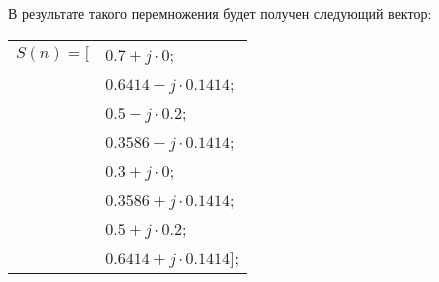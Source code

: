 В результате такого перемножения будет получен следующий вектор:
\begin{table}[H]
    \centering
    \begin{tabular}{ll}
        \(S(n) = [\) & 
        \(0.7 + j \cdot 0\); \\
        & \(0.6414 - j \cdot 0.1414\); \\
        & \(0.5 - j \cdot 0.2\); \\
        & \(0.3586 - j \cdot 0.1414\); \\
        & \(0.3 + j \cdot 0\); \\
        & \(0.3586 + j \cdot 0.1414\); \\
        & \(0.5 + j \cdot 0.2\); \\
        & \(0.6414 + j \cdot 0.1414]\); \\
    \end{tabular}
\end{table}

\newpage
